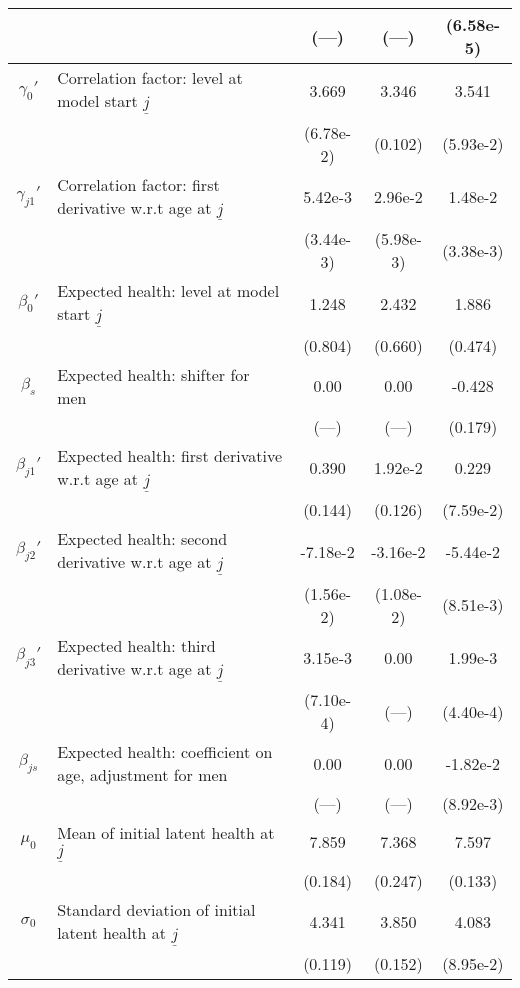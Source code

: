 \begin{table}
\begin{center}
{\begin{tabular}{clccc}
\rule{0pt}{2.2ex} & & (---) & (---) & (6.58e-5) \\
\hline
\rule{0pt}{2.2ex}$\gamma_{0}'$ & Correlation factor: level at model start $\underline{j}$ & 3.669 & 3.346 & 3.541 \\
\rule{0pt}{2.2ex} & & (6.78e-2) & (0.102) & (5.93e-2) \\
\rule{0pt}{2.2ex}$\gamma_{j1}'$ & Correlation factor: first derivative w.r.t age at $\underline{j}$ & 5.42e-3 & 2.96e-2 & 1.48e-2 \\
\rule{0pt}{2.2ex} & & (3.44e-3) & (5.98e-3) & (3.38e-3) \\
\hline
\rule{0pt}{2.2ex}$\beta_{0}'$ & Expected health: level at model start $\underline{j}$ & 1.248 & 2.432 & 1.886 \\
\rule{0pt}{2.2ex} & & (0.804) & (0.660) & (0.474) \\
\rule{0pt}{2.2ex}$\beta_{s}$ & Expected health: shifter for men & 0.00 & 0.00 & -0.428 \\
\rule{0pt}{2.2ex} & & (---) & (---) & (0.179) \\
\rule{0pt}{2.2ex}$\beta_{j1}'$ & Expected health: first derivative w.r.t age at $\underline{j}$ & 0.390 & 1.92e-2 & 0.229 \\
\rule{0pt}{2.2ex} & & (0.144) & (0.126) & (7.59e-2) \\
\rule{0pt}{2.2ex}$\beta_{j2}'$ & Expected health: second derivative w.r.t age at $\underline{j}$ & -7.18e-2 & -3.16e-2 & -5.44e-2 \\
\rule{0pt}{2.2ex} & & (1.56e-2) & (1.08e-2) & (8.51e-3) \\
\rule{0pt}{2.2ex}$\beta_{j3}'$ & Expected health: third derivative w.r.t age at $\underline{j}$ & 3.15e-3 & 0.00 & 1.99e-3 \\
\rule{0pt}{2.2ex} & & (7.10e-4) & (---) & (4.40e-4) \\
\rule{0pt}{2.2ex}$\beta_{js}$ & Expected health: coefficient on age, adjustment for men & 0.00 & 0.00 & -1.82e-2 \\
\rule{0pt}{2.2ex} & & (---) & (---) & (8.92e-3) \\
\hline
\rule{0pt}{2.2ex}$\mu_0$ & Mean of initial latent health at $\underline{j}$ & 7.859 & 7.368 & 7.597 \\
\rule{0pt}{2.2ex} & & (0.184) & (0.247) & (0.133) \\
\rule{0pt}{2.2ex}$\sigma_0$ & Standard deviation of initial latent health at $\underline{j}$ & 4.341 & 3.850 & 4.083 \\
\rule{0pt}{2.2ex} & & (0.119) & (0.152) & (8.95e-2) \\

\end{tabular}}
\end{center}
\end{table}
